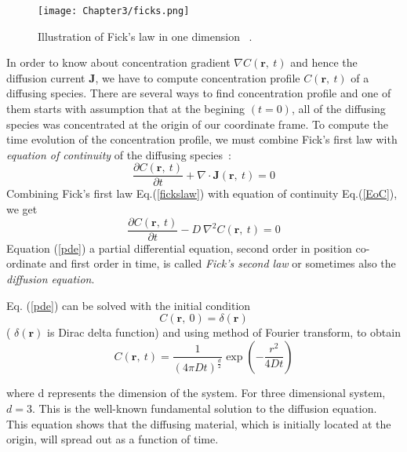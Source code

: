       \begin{figure}[h!]
       \centering
       \texttt{[image: Chapter3/ficks.png]}
       \caption[Illustration of Fick's law.]{Illustration of Fick's law in one dimension ~\citep{mehrer2007}.} 
       \label{diffusion_ficks} 
       \end{figure}
       
       In order to know about concentration gradient $\nabla C(\textbf{r},~t)$ and hence the diffusion current $\textbf{J}$, we have to compute concentration profile $C(\textbf{r},~ t)$ of a diffusing species.  There are several ways to find concentration profile and one of them starts with assumption that at the begining $(t=0)$, all of the diffusing species was concentrated at the origin of our coordinate frame. To compute the time evolution of the concentration profile, we must combine Fick's first law with \textit{equation of continuity}  of the diffusing species~\citep{mehrer2007}:  
 \begin{equation}
 \label{EoC}
 \frac{\partial C(\mathbf{r},~t)}{\partial t} +   \nabla \cdot \mathbf{J}(\mathbf{r},~t) = 0
 \end{equation}
  Combining Fick's first law Eq.(\ref{fickslaw}) with equation of continuity Eq.(\ref{EoC}), we get
\begin{equation}
 \label{pde}
  \frac{\partial C(\textbf{r},~t)}{\partial t} - D~\nabla^2C(\textbf{r},~t) = 0
  \end{equation}  
  Equation (\ref{pde})  a partial differential equation, second order in position co-ordinate and first order in time,  is called \textit{Fick's second law} or sometimes also the \textit{diffusion equation}.  
  
   Eq. (\ref{pde}) can be  solved with the initial condition 
   \begin{equation}
   C(\textbf{r},~0) =  \delta(\textbf{r})
   \end{equation}  
  ( $\delta(\textbf{r})$ is Dirac delta function) and using method of Fourier transform,  to obtain 
    \begin{equation}
        \label{concentration}
        C(\textbf{r},~t) = \frac{1}{(4\pi D t)^{\frac{d}{2}}} \exp\left( -\frac{r^2}{4Dt}\right)
        \end{equation}
        
 where d represents the dimension of the system. For three dimensional system, $d=3$. This is the well-known fundamental solution to the diffusion equation. This equation shows that the diffusing material, which is initially located at the origin, will spread out as a function of time.
 
